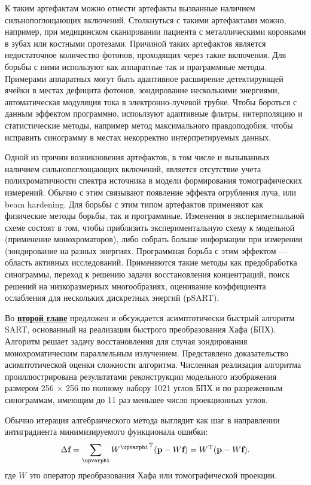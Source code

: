 К таким артефактам можно отнести артефакты вызванные наличием сильнопоглощающих включений.
Столкнуться с такими артефактами можно, например, при медицинском сканировании пациента с металлическими коронками в зубах или костными протезами.
Причиной таких артефактов является недостаточное количество фотонов, проходящих через такие включения.
Для борьбы с ними используют как аппаратные так и праграммные методы.
Примерами аппаратных могут быть адаптивное расширение детектирующей ячейки в местах дефицита фотонов, зондирование несколькими энергиями, автоматическая модуляция тока в электронно-лучевой трубке.
Чтобы бороться с данным эффектом программно, испоьлзуют адаптивные фльтры, интерполяцию и статистические методы, например метод максимального правдоподобия, чтобы исправить синограмму в местах некорректно интерпретируемых данных.

Одной из причин возникновения артефактов, в том числе и вызыванных наличием сильнопоглощающих включений, является отсутствие учета полихроматичности спектра источника в модели формирования томографических измерений.
Обычно с этим связывают появление эффекта огрубления луча, или beam hardening.
Для борьбы с этим типом артефактов применяют как физические методы борьбы, так и программные.
Изменения в экспериметнальной схеме состоят в том, чтобы приблизить экспериментальную схему к модельной (применение монохроматоров), либо собрать больше информации при измерении (зондирование на разных энергиях.
Программная борьба с этим эффектом --- область активных исследований.
Применяются такие методы как предобработка синограммы, переход к решению задачи восстановления концентраций, поиск решений на низкоразмерных многообразиях, оценивание коэффициента ослабления для нескольких дискретных энергий (pSART).

Во \underline{\textbf{второй главе}} предложен и обсуждается асимптотически быстрый алгоритм SART, основанный на реализации быстрого преобразования Хафа (БПХ).
Алгоритм решает задачу восстановления для случая зондирования монохроматическим параллельным излучением.
Представлено доказательство асимптотической оценки сложности алгоритма.
Численная реализация алгоритма проиллюстрирована результатами реконструкции модельного изображения размером 256 $\times$ 256 по полному набору 1021 углов БПХ и по разреженным синограммам, имеющим до 11 раз меньшее число проекционных углов.

Обычно итерация алгебраического метода выглядит как шаг в направлении антиградиента минимизируемого функционала ошибки:
\begin{equation}\notag
  \Delta \textbf f = \sum_\varphi {{W^\varphi}^{\mathrm T}(\textbf p - W\textbf f) } = W^{\mathrm T}(\textbf p - W \textbf f).
\end{equation}
где $W$ это оператор преобразования Хафа или томографической проекции.
  
